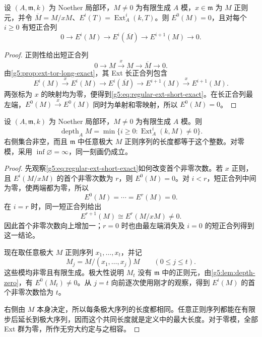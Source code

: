 \begin{lemma}\label{g5:lem:regular-element-ext-sequence}
	设 \((A,\mathfrak m,k)\) 为 Noether 局部环，\(M\ne0\) 为有限生成 \(A\) 模，\(x\in\mathfrak m\) 为 \(M\) 正则元，并令 \(\overline M=M/xM\)、\(E^i(T)=\operatorname{Ext}^i_A(k,T)\)。则 \(E^0(M)=0\)，且对每个 \(i\geq0\) 有短正合列
	\begin{equation}\label{g5:eq:regular-ext-short-exact}
		0\longrightarrow E^i(M)\longrightarrow E^i(\overline M)
		\longrightarrow E^{i+1}(M)\longrightarrow0.
	\end{equation}
\end{lemma}
\begin{proof}
	正则性给出短正合列
	\[
		0\longrightarrow M\xrightarrow{\,x\,}M
		\longrightarrow\overline M\longrightarrow0.
	\]
	由\cref{g5:prop:ext-tor-long-exact}，其 Ext 长正合列包含
	\[
		E^i(M)\xrightarrow{\,x\,}E^i(M)
		\longrightarrow E^i(\overline M)
		\longrightarrow E^{i+1}(M)\xrightarrow{\,x\,}E^{i+1}(M).
	\]
	两张标为 \(x\) 的映射均为零，便得到\eqref{g5:eq:regular-ext-short-exact}。在长正合列最左端，\(E^0(M)\xrightarrow{x}E^0(M)\) 同时为单射和零映射，所以 \(E^0(M)=0\)。
\end{proof}

\begin{theorem}\label{g5:thm:depth-ext}
	设 \((A,\mathfrak m,k)\) 为 Noether 局部环，\(M\ne0\) 为有限生成 \(A\) 模。则
	\[
		\operatorname{depth}_A M
		=\min\{i\geq0:\operatorname{Ext}^i_A(k,M)\ne0\}.
	\]
	右侧集合非空，而且 \(\mathfrak m\) 中任意极大 \(M\) 正则序列的长度都等于这个整数。对零模，采用 \(\inf\varnothing=\infty\)，同一刻画仍成立。
\end{theorem}
\begin{proof}
	先观察\eqref{g5:eq:regular-ext-short-exact}如何改变首个非零次数。若 \(x\) 正则，且 \(E^i(M/xM)\) 的首个非零次数为 \(r\)，则 \(E^0(M)=0\)。对 \(i<r\)，短正合列中间为零，使两端都为零，所以
	\[
		E^0(M)=\cdots=E^r(M)=0.
	\]
	在 \(i=r\) 时，同一短正合列给出
	\[
		E^{r+1}(M)\cong E^r(M/xM)\ne0.
	\]
	因此首个非零次数向上增加一；\(r=0\) 时也由最左端消失及 \(i=0\) 的短正合列得到这一结论。

	现在取任意极大 \(M\) 正则序列 \(x_1,\ldots,x_t\)，并记
	\[
		M_j=M/(x_1,\ldots,x_j)M\qquad(0\leq j\leq t).
	\]
	这些模均非零且有限生成。极大性说明 \(M_t\) 没有 \(\mathfrak m\) 中的正则元，由\cref{g5:lem:depth-zero}，有 \(E^0(M_t)\ne0\)。从 \(j=t\) 向前逐次使用刚才的观察，得到 \(E^i(M)\) 的首个非零次数恰为 \(t\)。

	右侧由 \(M\) 本身决定，所以每条极大序列的长度都相同。任意正则序列都能在有限步后延长到极大序列，因而这个共同长度就是定义中的最大长度。对于零模，全部 Ext 群为零，所作无穷大约定与之相容。
\end{proof}

